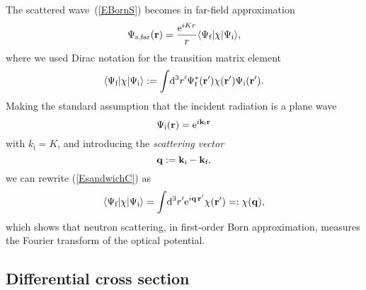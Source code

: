 The scattered wave~(\ref{EBornS})
becomes in far-field approximation 
\begin{equation}\label{EsandwichC}
  \Psi_\text{s,far}(\mathbf{r})
  = \frac{{\rm e}^{iKr}}{r}
    \langle \Psi_\text{f}|\chi|\Psi_\text{i}\rangle,
\end{equation}
where we used Dirac notation for the transition matrix element
\begin{equation}\label{Etrama}
  \langle \Psi_\text{f}|\chi|\Psi_\text{i}\rangle
  := \int\!{\rm d}^3r' \Psi^*_\text{f}(\mathbf{r}')\chi(\mathbf{r}')\Psi_\text{i}(\mathbf{r}').
\end{equation}
Making the standard assumption
that the incident radiation is a plane wave
\begin{equation}\label{EPsi0Plane}
  \Psi_\text{i}(\mathbf{r})={\rm e}^{i \mathbf{k}_\text{i} \mathbf{r}}
\end{equation}
with $k_\text{i}=K$,
and introducing the \textit{scattering vector}
\begin{equation}
  \mathbf{q}:=\mathbf{k}_\text{i}-\mathbf{k}_\text{f},
\end{equation}
we can rewrite (\ref{EsandwichC}) as
\begin{equation}\label{EBornQ}
  \langle \Psi_\text{f}|\chi|\Psi_\text{i}\rangle
  = \int\!{\rm d}^3r' {\rm e}^{i\mathbf{q}\,\mathbf{r}'}\chi(\mathbf{r}')
  =: \chi(\mathbf{q}),
\end{equation}
which shows that neutron scattering,
in first-order Born approximation,
measures the Fourier transform
of the optical potential.


\subsection{Differential cross section}

